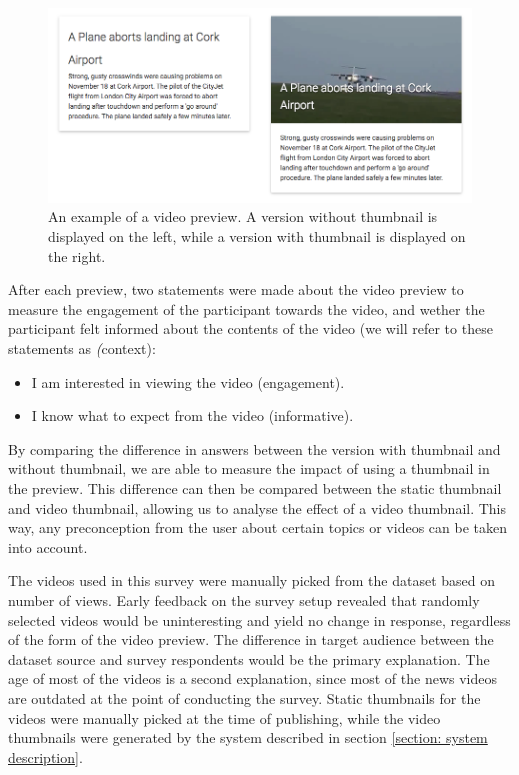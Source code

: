 \documentclass{../resources/sig-alternate-05-2015}
\begin{document}
\begin{figure}[h]
  \caption{An example of a video preview. A version without thumbnail is displayed on the left, while a version with thumbnail is displayed on the right.}
  \label{figure: survey preview}
  \includegraphics[width=\linewidth]{resources/preview-combined.png}
\end{figure}

After each preview, two statements were made about the video preview to measure the engagement of the participant towards the video, and wether the participant felt informed about the contents of the video (we will refer to these statements as \textit(context):

\begin{itemize}
	\item I am interested in viewing the video (engagement).
	\item I know what to expect from the video (informative).
\end{itemize}

By comparing the difference in answers between the version with thumbnail and without thumbnail, we are able to measure the impact of using a thumbnail in the preview. This difference can then be compared between the static thumbnail and video thumbnail, allowing us to analyse the effect of a video thumbnail. This way, any preconception from the user about certain topics or videos can be taken into account.

The videos used in this survey were manually picked from the dataset based on number of views. Early feedback on the survey setup revealed that randomly selected videos would be uninteresting and yield no change in response, regardless of the form of the video preview. The difference in target audience between the dataset source and survey respondents would be the primary explanation. The age of most of the videos is a second explanation, since most of the news videos are outdated at the point of conducting the survey. Static thumbnails for the videos were manually picked at the time of publishing, while the video thumbnails were generated by the system described in section \ref{section: system description}.
\end{document}
